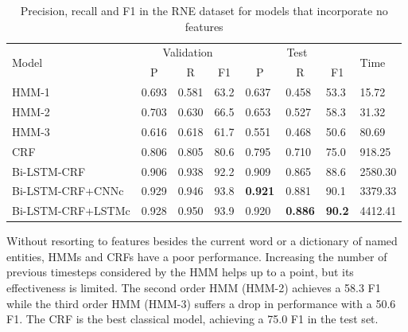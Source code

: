 \documentclass{nle}
\begin{document}
\begin{table}[h]
  \small
  \begin{center}
    \begin{tabular}{ llllllll }
      \toprule
      \multirow{2}{*}{Model} & \multicolumn{3}{c}{Validation} & \multicolumn{3}{c}{Test} & \multirow{2}{*}{Time} \\
                             & \multicolumn{1}{c}{P} & \multicolumn{1}{c}{R} & \multicolumn{1}{c}{F1}
                             & \multicolumn{1}{c}{P} & \multicolumn{1}{c}{R} & \multicolumn{1}{c}{F1} & \\
      \midrule
      HMM-1                 & 0.693 & 0.581 & 63.2 & 0.637 & 0.458 & 53.3 & 15.72   \\
      HMM-2                 & 0.703 & 0.630 & 66.5 & 0.653 & 0.527 & 58.3 & 31.32   \\
      HMM-3                 & 0.616 & 0.618 & 61.7 & 0.551 & 0.468 & 50.6 & 80.69   \\
      CRF                   & 0.806 & 0.805 & 80.6 & 0.795 & 0.710 & 75.0 & 918.25  \\
      Bi-LSTM-CRF           & 0.906 & 0.938 & 92.2 & 0.909 & 0.865 & 88.6 & 2580.30 \\
      Bi-LSTM-CRF+CNNc      & 0.929 & 0.946 & 93.8 & \textbf{0.921} & 0.881 & 90.1 & 3379.33 \\
      Bi-LSTM-CRF+LSTMc     & 0.928 & 0.950 & 93.9 & 0.920 & \textbf{0.886} & \textbf{90.2} & 4412.41 \\
      \bottomrule
    \end{tabular}
  \end{center}
  \caption{Precision, recall and F1 in the RNE dataset for models that incorporate no features}
  \label{tab:experiment1}
\end{table}

Without resorting to features besides the current word or a dictionary of named entities, HMMs and CRFs have a
poor performance. Increasing the number of previous timesteps considered by the HMM helps
up to a point, but its effectiveness is limited. The second order HMM (HMM-2) achieves a 58.3 F1
while the third order HMM (HMM-3) suffers a drop in performance with a 50.6 F1. The CRF is the
best classical model, achieving a 75.0 F1 in the test set.
\end{document}
